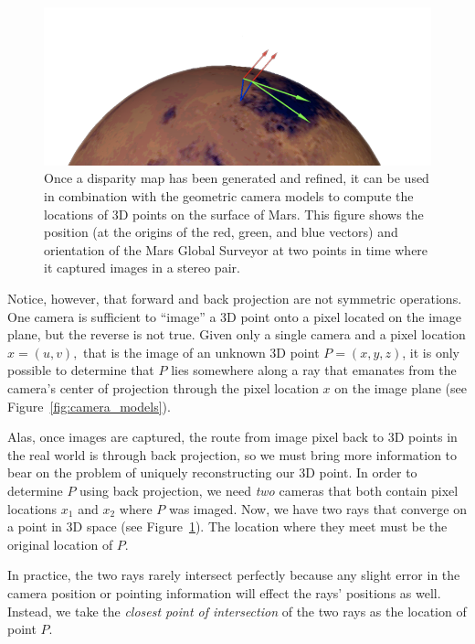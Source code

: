 \begin{figure}[tb]
  \centering
  \includegraphics[width=12cm]{images/correlation/triangulation}
  \caption{Once a disparity map has been generated and refined, it can
    be used in combination with the geometric camera models to compute
    the locations of 3D points on the surface of Mars.  This figure
    shows the position (at the origins of the red, green, and blue vectors) and
	orientation of the Mars Global Surveyor at
    two points in time where it captured images in a stereo pair.}
  \label{fig:triangulation}
\end{figure}

Notice, however, that forward and back projection are not symmetric
operations.  One camera is sufficient to ``image'' a 3D point onto a
pixel located on the image plane, but the reverse is not true.  Given
only a single camera and a pixel location $x = (u,v),$ that is the
image of an unknown 3D point $P = (x,y,z)$, it is only possible to
determine that $P$ lies somewhere along a ray that emanates from the
camera's center of projection through the pixel location $x$ on the
image plane (see Figure~\ref{fig:camera_models}).

Alas, once images are captured, the route from image pixel back to 3D
points in the real world is through back projection, so we must bring
more information to bear on the problem of uniquely reconstructing our
3D point.  In order to determine $P$ using back projection, we need
{\em two} cameras that both contain pixel locations $x_1$ and $x_2$
where $P$ was imaged.  Now, we have two rays that converge on a point
in 3D space (see Figure~\ref{fig:triangulation}). The location where
they meet must be the original location of $P$.

In practice, the two rays rarely intersect perfectly because any
slight error in the camera position or pointing information will
effect the rays' positions as well.  Instead, we take the {\em closest
  point of intersection} of the two rays as the location of point
$P$.

